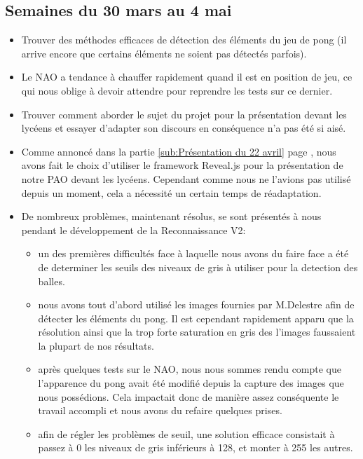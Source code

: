   \subsection{Semaines du 30 mars au 4 mai}
  \label{sub:Semaines du 30 mars au 4 mai}
    \begin{itemize}
      \item Trouver des méthodes efficaces de détection des éléments du jeu de pong (il arrive encore que certains éléments ne soient pas détectés parfois).
      \item Le NAO a tendance à chauffer rapidement quand il est en position de jeu, ce qui nous oblige à devoir attendre pour reprendre les tests sur ce dernier.
      \item Trouver comment aborder le sujet du projet pour la présentation devant les lycéens et essayer d’adapter son discours en conséquence n’a pas été si aisé.
      \item Comme annoncé dans la partie \ref{sub:Présentation du 22 avril} page \pageref{sub:Présentation du 22 avril}, nous avons fait le choix d’utiliser le framework Reveal.js pour la présentation de notre PAO devant les lycéens.
      Cependant comme nous ne l’avions pas utilisé depuis un moment, cela a nécessité un certain temps de réadaptation.
      \item De nombreux problèmes, maintenant résolus, se sont présentés à nous pendant le développement de la Reconnaissance V2:
            \begin{itemize}
              \item un des premières difficultés face à laquelle nous avons du faire face a été de determiner les seuils des niveaux de gris à utiliser pour la detection des balles.
              \item nous avons tout d’abord utilisé les images fournies par M.Delestre afin de détecter les éléments du pong.
              Il est cependant rapidement apparu que la résolution ainsi que la trop forte saturation en gris des l’images faussaient la plupart de nos résultats.
              \item après quelques tests sur le NAO, nous nous sommes rendu compte que l’apparence du pong avait été modifié depuis la capture des images que nous possédions.
              Cela impactait donc de manière assez conséquente le travail accompli et nous avons du refaire quelques prises.
              \item afin de régler les problèmes de seuil, une solution efficace consistait à passez à 0 les niveaux de gris inférieurs à 128, et monter à 255 les autres.

\end{itemize}
\end{itemize}
